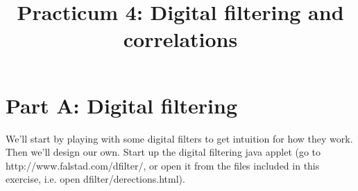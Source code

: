 \documentclass[prd,floatfix,preprintnumbers,amsmath,amssymb,nofootinbib,superscriptaddress]{revtex4}
\begin{document}
\title{Practicum 4: Digital filtering and correlations}

\maketitle

\section*{Part A: Digital filtering}

We'll start by playing with some digital filters to get intuition 
for how they work. Then we'll design our own. Start up the digital filtering 
java applet (go to http://www.falstad.com/dfilter/, or open it
from the files included in this exercise, i.e. open dfilter/derections.html).
\end{document}

